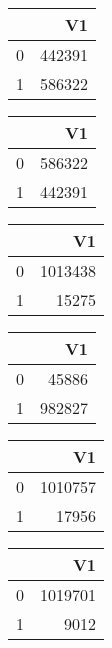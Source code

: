 \bigskip\bigskip
\centering
\begin{tabular}{rr}
  \hline
 & V1 \\ 
  \hline
0 & 442391 \\ 
  1 & 586322 \\ 
   \hline
\end{tabular}

\bigskip\bigskip
\centering
\begin{tabular}{rr}
  \hline
 & V1 \\ 
  \hline
0 & 586322 \\ 
  1 & 442391 \\ 
   \hline
\end{tabular}

\bigskip\bigskip
\centering
\begin{tabular}{rr}
  \hline
 & V1 \\ 
  \hline
0 & 1013438 \\ 
  1 & 15275 \\ 
   \hline
\end{tabular}

\bigskip\bigskip
\centering
\begin{tabular}{rr}
  \hline
 & V1 \\ 
  \hline
0 & 45886 \\ 
  1 & 982827 \\ 
   \hline
\end{tabular}

\bigskip\bigskip
\centering
\begin{tabular}{rr}
  \hline
 & V1 \\ 
  \hline
0 & 1010757 \\ 
  1 & 17956 \\ 
   \hline
\end{tabular}

\bigskip\bigskip
\centering
\begin{tabular}{rr}
  \hline
 & V1 \\ 
  \hline
0 & 1019701 \\ 
  1 & 9012 \\ 
   \hline
\end{tabular}

